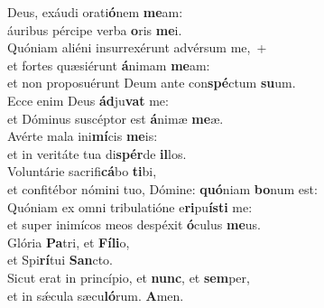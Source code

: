 \evenverse Deus, exáudi orati\textbf{ó}nem \textbf{me}am:~\*\\
\evenverse áuribus pércipe verba \textbf{o}ris \textbf{me}i.\\
\oddverse Quóniam aliéni insurrexérunt advérsum me,~+\\
\oddverse  et fortes quæsiérunt \textbf{á}nimam \textbf{me}am:~\*\\
\oddverse et non proposuérunt Deum ante con\textbf{spé}ctum \textbf{su}um.\\
\evenverse Ecce enim Deus \textbf{ád}ju\textbf{vat} me:~\*\\
\evenverse et Dóminus suscéptor est \textbf{á}nimæ \textbf{me}æ.\\
\oddverse Avérte mala ini\textbf{mí}cis \textbf{me}is:~\*\\
\oddverse et in veritáte tua di\textbf{spér}de \textbf{il}los.\\
\evenverse Voluntárie sacrifi\textbf{cá}bo \textbf{ti}bi,~\*\\
\evenverse et confitébor nómini tuo, Dómine: \textbf{quó}niam \textbf{bo}num est:\\
\oddverse Quóniam ex omni tribulatióne e\textbf{ri}pu\textbf{í}\textbf{sti} me:~\*\\
\oddverse et super inimícos meos despéxit \textbf{ó}culus \textbf{me}us.\\
\evenverse Glória \textbf{Pa}tri, et \textbf{Fí}\textbf{li}o,~\*\\
\evenverse et Spi\textbf{rí}tui \textbf{San}cto.\\
\oddverse Sicut erat in princípio, et \textbf{nunc}, et \textbf{sem}per,~\*\\
\oddverse et in sǽcula sæcu\textbf{ló}rum. \textbf{A}men.\\
